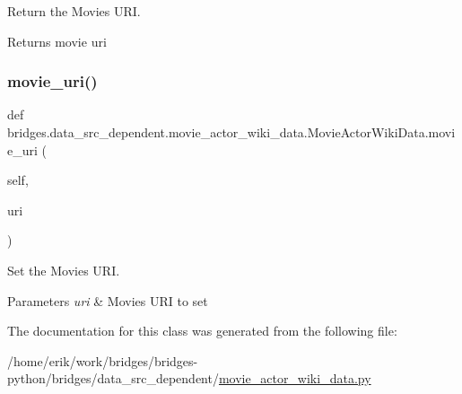 Return the Movie\textquotesingle{}s U\+RI. 

\begin{DoxyReturn}{Returns}
movie uri 
\end{DoxyReturn}
\mbox{\label{classbridges_1_1data__src__dependent_1_1movie__actor__wiki__data_1_1_movie_actor_wiki_data_ae9e09370897da0ed4daa3a9378907b50}} 
\subsubsection{\texorpdfstring{movie\+\_\+uri()}{movie\_uri()}\hspace{0.1cm}{\footnotesize\ttfamily [2/2]}}
{\footnotesize\ttfamily def bridges.\+data\+\_\+src\+\_\+dependent.\+movie\+\_\+actor\+\_\+wiki\+\_\+data.\+Movie\+Actor\+Wiki\+Data.\+movie\+\_\+uri (\begin{DoxyParamCaption}\item[{}]{self,  }\item[{}]{uri }\end{DoxyParamCaption})}



Set the Movie\textquotesingle{}s U\+RI. 


\begin{DoxyParams}{Parameters}
{\em uri} & Movie\textquotesingle{}s U\+RI to set \\
\hline
\end{DoxyParams}


The documentation for this class was generated from the following file\+:\begin{DoxyCompactItemize}
\item 
/home/erik/work/bridges/bridges-\/python/bridges/data\+\_\+src\+\_\+dependent/\hyperlink{movie__actor__wiki__data_8py}{movie\+\_\+actor\+\_\+wiki\+\_\+data.\+py}\end{DoxyCompactItemize}
